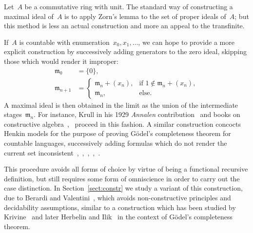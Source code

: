 \documentclass[com,11pt,crcready]{iosart2x}
\theoremstyle{definition}
\theoremstyle{plain}
\theoremstyle{remark}
\newcommand{\?}{\,{:}\,}
\newcommand{\mmm}{\mathfrak{m}}
\renewcommand{\_}{\mathpunct{.}\,}
\begin{document}
\begin{frontmatter}
\begin{keyword}
\end{keyword}

\end{frontmatter}

\noindent
Let~$A$ be a commutative ring with unit. The standard way of constructing a
maximal ideal of~$A$ is to apply Zorn's lemma to the set of proper ideals
of~$A$; but this method is less an actual construction and more an appeal to
the transfinite.

If~$A$ is countable with enumeration~$x_0,x_1,\ldots$, we can hope to provide a
more explicit construction by successively adding generators to the zero ideal,
skipping those which would render it improper:
\begin{equation}\label{eq:orig-construction}
  \tag{$\star$}\begin{aligned}
  \mmm_0 &= \{ 0 \}, \\
  \mmm_{n+1} &= \begin{cases}
    \mmm_n + (x_n), & \text{if $1 \not\in \mmm_n + (x_n)$}, \\
    \mmm_n, & \text{else.}
  \end{cases}
\end{aligned}\end{equation}
A maximal ideal is then obtained in the limit as the union of the intermediate
stages~$\mmm_n$. For instance, Krull in his 1929 \emph{Annalen} contribution~\cite[Hilfs\-satz]{krull:ohne} and books on constructive
algebra~\cite[Lemma~VI.3.2]{mines-richman-ruitenburg:constructive-algebra},~\cite[comment after Theorem~VII.5.2]{lombardi-quitte:constructive-algebra} proceed in this fashion.
A similar
construction concocts Henkin models for the purpose of proving
Gödel's completeness theorem for countable languages, successively adding
formulas which do not render the current set
inconsistent~\cite[Satz~I.56]{tarski:fundamental},~\cite[Lemma~1.5.7]{dalen:logic},~\cite[Lemma~III.5.4]{simpson:subsystems},~\cite[Lemma~2.1]{ishihara-khoussainov-nerode:decidable-kripke-models},~\cite[Section~A.4]{coquand-lombardi:hidden-krull}.

This procedure avoids all forms of choice by virtue of being a
functional recursive definition, but still requires some form of omniscience in
order to carry out the case distinction.
In Section~\ref{sect:constr} we study a variant of this construction, due to Berardi and
Valentini~\cite{berardi-valentini:krivine}, which
avoids non-constructive principles and decidability assumptions, similar to
a construction which has been studied by
Krivine~\cite[p.~410]{krivine:completeness} and later Herbelin and
Ilik~\cite[p.~11]{herbelin-ilik:henkin} in the
context of Gödel's completeness theorem.
\end{document}
